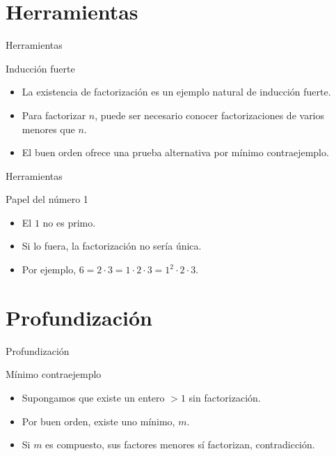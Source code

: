 \documentclass[aspectratio=169,11pt]{beamer}
\begin{document}
\section{Herramientas}

\begin{frame}{Herramientas}
\begin{block}{Inducción fuerte}
\begin{itemize}
  \item La existencia de factorización es un ejemplo natural de inducción fuerte.
  \item Para factorizar \(n\), puede ser necesario conocer factorizaciones de varios menores que \(n\).
  \item El buen orden ofrece una prueba alternativa por mínimo contraejemplo.
\end{itemize}
\end{block}
\end{frame}

\begin{frame}{Herramientas}
\begin{block}{Papel del número 1}
\begin{itemize}
  \item El \(1\) no es primo.
  \item Si lo fuera, la factorización no sería única.
  \item Por ejemplo, \(6=2\cdot 3=1\cdot 2\cdot 3=1^2\cdot 2\cdot 3\).
\end{itemize}
\end{block}
\end{frame}

\section{Profundización}

\begin{frame}{Profundización}
\begin{block}{Mínimo contraejemplo}
\begin{itemize}
  \item Supongamos que existe un entero \(>1\) sin factorización.
  \item Por buen orden, existe uno mínimo, \(m\).
  \item Si \(m\) es compuesto, sus factores menores sí factorizan, contradicción.
\end{itemize}
\end{block}
\end{frame}
\end{document}

